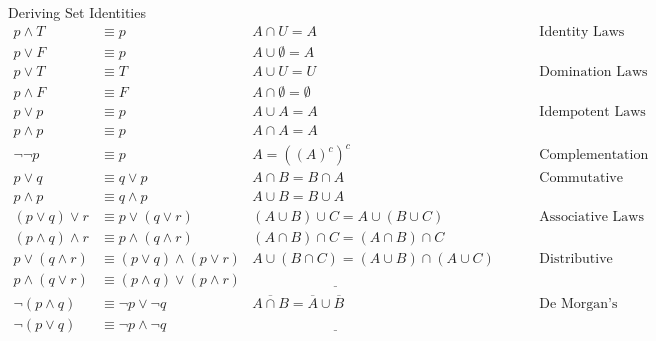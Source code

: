 \begin{exmp}Deriving Set Identities
\begin{align}
p \land T &\equiv p  &A\cap U=A \hspace{1cm}& \text{Identity Laws}\\
p \lor F &\equiv p  &A\cup \emptyset=A \hspace{1cm}& \\
p \lor T & \equiv T &A\cup U=U \hspace{1cm}& \text{Domination Laws}\\
p \land F & \equiv F &A\cap \emptyset=\emptyset \hspace{1cm}& \\
p \lor p & \equiv p &A\cup A=A \hspace{1cm}& \text{Idempotent Laws}\\
p \land p & \equiv p &A\cap A=A\hspace{1cm}& \\
\lnot \lnot p & \equiv p &A=((A)^c)^c\hspace{1cm}& \text{Complementation}\\
p \lor q & \equiv q \lor p &A\cap B=B\cap A\hspace{1cm}& \text{Commutative Laws}\\
p \land p & \equiv q \land p &A\cup B=B\cup A\hspace{1cm}& \\
(p \lor q) \lor r & \equiv p \lor (q \lor r) &(A\cup B)\cup C=A\cup (B\cup C)\hspace{1cm}& \text{Associative Laws}\\
(p \land q) \land r & \equiv p \land (q \land r)&(A\cap B)\cap C=(A\cap B)\cap C\hspace{1cm}& \\
p \lor (q\land r) & \equiv (p \lor q ) \land 
 (p \lor r)  &A \cup (B\cap C) = (A \cup B ) \cap 
 (A \cup C)\hspace{1cm}& \text{Distributive Laws}\\
p \land (q\lor r) & \equiv (p \land q) \lor (p \land r) &\underline{\hspace{5cm}}\hspace{1cm}& \\
\lnot (p\land q) & \equiv \lnot p \lor \lnot q & \overline{A\cap B}= \overline{A} \cup \overline{B} \hspace{1cm}& \text{De Morgan's Laws}\\
\lnot (p\lor q) & \equiv \lnot p \land \lnot q &\underline{\hspace{5cm}}\hspace{1cm}& \\

\end{align}
\end{exmp}
